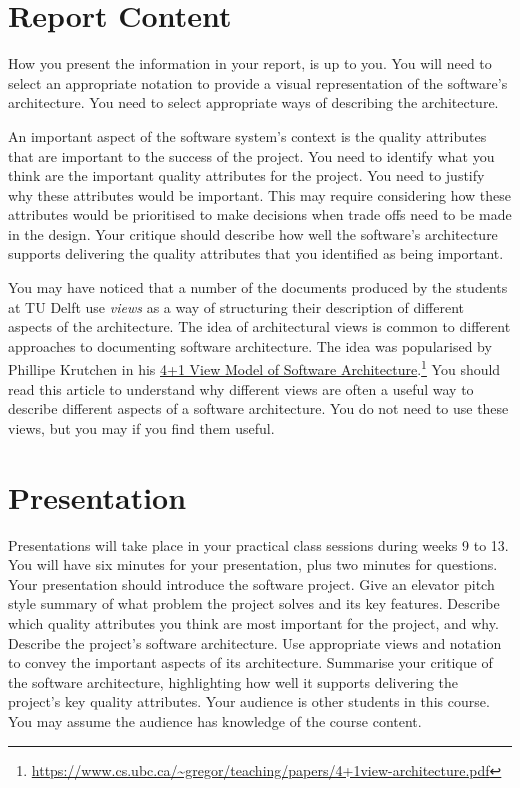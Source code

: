 \documentclass{csse4400}
\begin{document}
\section{Report Content}
How you present the information in your report, is up to you. You will need to select an appropriate notation 
to provide a visual representation of the software's architecture. You need to select appropriate ways of describing
the architecture.

An important aspect of the software system's context is the quality attributes that are important to the success of the project.
You need to identify what you think are the important quality attributes for the project. 
You need to justify why these attributes would be important.
This may require considering how these attributes would be prioritised to make decisions when trade offs need to be made in the design.
Your critique should describe how well the software's architecture supports delivering the quality attributes that you identified as being important.

You may have noticed that a number of the documents produced by the students at TU Delft use \textsl{views} 
as a way of structuring their description of different aspects of the architecture. The idea of architectural views
is common to different approaches to documenting software architecture. The idea was popularised by Phillipe 
Krutchen in his \href{https://www.cs.ubc.ca/~gregor/teaching/papers/4+1view-architecture.pdf}
{4+1 View Model of Software Architecture}.\footnote{\url{https://www.cs.ubc.ca/~gregor/teaching/papers/4+1view-architecture.pdf}}
You should read this article to understand why different views are often a useful way to describe different
aspects of a software architecture. You do not need to use these views, but you may if you find them useful.

\section{Presentation}
Presentations will take place in your practical class sessions during weeks 9 to 13.
You will have six minutes for your presentation, plus two minutes for questions.
Your presentation should introduce the software project.
Give an elevator pitch style summary of what problem the project solves and its key features.
Describe which quality attributes you think are most important for the project, and why.
Describe the project's software architecture. Use appropriate views and notation to convey the important aspects of its architecture.
Summarise your critique of the software architecture, highlighting how well it supports delivering the project's key quality attributes.
Your audience is other students in this course. You may assume the audience has knowledge of the course content.
\end{document}
